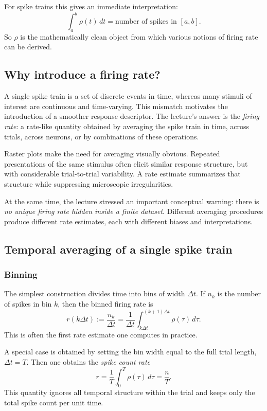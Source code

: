 \documentclass[11pt]{article}
\begin{document}
For spike trains this gives an immediate interpretation:
\[
\int_a^b \rho(t)\,dt = \text{number of spikes in } [a,b].
\]
So $\rho$ is the mathematically clean object from which various notions of firing rate can be derived.

\subsection{Why introduce a firing rate?}

A single spike train is a set of discrete events in time, whereas many stimuli of interest are continuous and time-varying. This mismatch motivates the introduction of a smoother response descriptor. The lecture's answer is the \emph{firing rate}: a rate-like quantity obtained by averaging the spike train in time, across trials, across neurons, or by combinations of these operations.

Raster plots make the need for averaging visually obvious. Repeated presentations of the same stimulus often elicit similar response structure, but with considerable trial-to-trial variability. A rate estimate summarizes that structure while suppressing microscopic irregularities.

At the same time, the lecture stressed an important conceptual warning: there is \emph{no unique firing rate hidden inside a finite dataset}. Different averaging procedures produce different rate estimates, each with different biases and interpretations.

\subsection{Temporal averaging of a single spike train}

\subsubsection{Binning}

The simplest construction divides time into bins of width $\Delta t$. If $n_k$ is the number of spikes in bin $k$, then the binned firing rate is
\[
r(k\Delta t) := \frac{n_k}{\Delta t}
= \frac{1}{\Delta t}\int_{k\Delta t}^{(k+1)\Delta t} \rho(\tau)\,d\tau.
\]
This is often the first rate estimate one computes in practice.

A special case is obtained by setting the bin width equal to the full trial length, $\Delta t = T$. Then one obtains the \emph{spike count rate}
\[
r = \frac{1}{T}\int_0^T \rho(\tau)\,d\tau = \frac{n}{T}.
\]
This quantity ignores all temporal structure within the trial and keeps only the total spike count per unit time.
\end{document}
